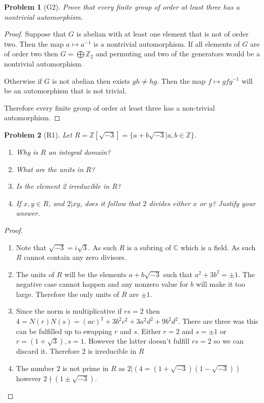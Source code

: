 \documentclass[10pt]{article}
\newcommand{\sk}{\vskip 10mm}
\newcommand{\bb}[1]{\mathbb{#1}}
\theoremstyle{plain}
\newtheorem{problem}{Problem}
\theoremstyle{remark}
\begin{document}
\sk

\begin{problem}[G2]
  Prove that every finite group of order at least three has a nontrivial
  automorphism.
\end{problem}

\begin{proof}
  Suppose that $G$ is abelian with at least one element that is not of order two.
  Then the map $a\mapsto a^{-1}$ is a nontrivial automorphism. If all elements
  of $G$ are of order two then $G=\bigoplus\bb{Z}_2$ and permuting and two of the
  generators would be a nontrivial automorphism.

  Otherwise if $G$ is not abelian then exists $gh\neq hg$. Then the map
  $f\mapsto gfg^{-1}$ will be an automorphism that is not trivial.

  Therefore every finite group of order at least three has a non-trivial
  automorphism.
\end{proof}

\sk

\begin{problem}[R1]
  Let $R=\bb{Z}[\sqrt{-3}]=\{a+b\sqrt{-3}|a,b\in\bb{Z}\}$.
  \begin{enumerate}
  \item Why is $R$ an integral domain?
  \item What are the units in $R$?
  \item Is the element 2 irreducible in $R$?
  \item If $x,y\in R$, and $2|xy$, does it follow that $2$ divides
    either $x$ or $y$? Justify your answer.
  \end{enumerate}
\end{problem}

\begin{proof}
  \begin{enumerate}
  \item Note that $\sqrt{-3}=i\sqrt{3}$. As such $R$ is a subring of $\bb{C}$
    which is a field. As such $R$ cannot contain any zero divisors.
  \item The units of $R$ will be the elements $a+b\sqrt{-3}$ such that
    $a^2+3b^2=\pm 1$. The negative case cannot happen and any nonzero value for $b$ will
    make it too large. Therefore the only units of $R$ are $\pm 1$.
  \item Since the norm is multiplicative if $rs=2$ then
    $4=N(r)N(s)=(ac)^2+3b^2c^2+3a^2d^2+9b^2d^2$. There are three was this can be fulfilled
    up to swapping $r$ and $s$. Either $r=2$ and $s=\pm 1$ or $r=(1+\sqrt{3}),s=1$.
    However the latter doesn't fulfill $rs=2$ so we can discard it. Therefore
    $2$ is irreducible in $R$
  \item The number $2$ is not prime in $R$ as $2|(4=(1+\sqrt{-3})(1-\sqrt{-3}))$
    however $2\nmid (1\pm \sqrt{-3})$.
  \end{enumerate}
\end{proof}
\end{document}
